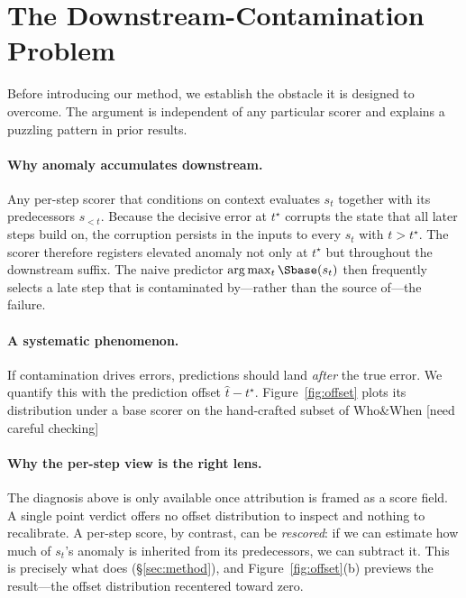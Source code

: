\section{The Downstream-Contamination Problem}
\label{sec:contam}

Before introducing our method, we establish the obstacle it is designed to overcome. The argument is independent of any particular scorer and explains a puzzling pattern in prior results.

\paragraph{Why anomaly accumulates downstream.} Any per-step scorer that conditions on context evaluates $s_t$ together with its predecessors $s_{<t}$. Because the decisive error at $t^\star$ corrupts the state that all later steps build on, the corruption persists in the inputs to every $s_t$ with $t>t^\star$. The scorer therefore registers elevated anomaly not only at $t^\star$ but throughout the downstream suffix. The naive predictor $\arg\max_t \Sbase(s_t)$ then frequently selects a late step that is contaminated by---rather than the source of---the failure.

\paragraph{A systematic phenomenon.} If contamination drives errors, predictions should land \emph{after} the true error. We quantify this with the prediction offset $\hat{t}-t^\star$. Figure~\ref{fig:offset} plots its distribution under a base scorer on the hand-crafted subset of Who\&When [need careful checking]

\paragraph{Why the per-step view is the right lens.} The diagnosis above is only available once attribution is framed as a score field. A single point verdict offers no offset distribution to inspect and nothing to recalibrate. A per-step score, by contrast, can be \emph{rescored}: if we can estimate how much of $s_t$'s anomaly is inherited from its predecessors, we can subtract it. This is precisely what \crr{} does (\S\ref{sec:method}), and Figure~\ref{fig:offset}(b) previews the result---the offset distribution recentered toward zero.


